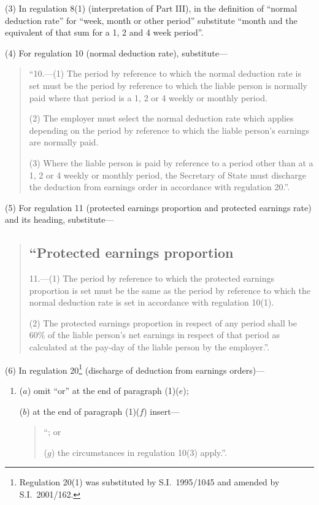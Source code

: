 \documentclass[12pt,a4paper]{article}
\begin{document}
(3) In regulation 8(1) (interpretation of Part III), in the definition of “normal deduction rate” for “week, month or other period” substitute “month and the equivalent of that sum for a 1, 2 and 4 week period”.

(4) For regulation 10 (normal deduction rate), substitute—
\begin{quotation}
“10.---(1)  The period by reference to which the normal deduction rate is set must be the period by reference to which the liable person is normally paid where that period is a 1, 2 or 4 weekly or monthly period.

(2) The employer must select the normal deduction rate which applies depending on the period by reference to which the liable person’s earnings are normally paid.

(3) Where the liable person is paid by reference to a period other than at a 1, 2 or 4 weekly or monthly period, the Secretary of State must discharge the deduction from earnings order in accordance with regulation 20.”.
\end{quotation}

(5) For regulation 11 (protected earnings proportion and protected earnings rate) and its heading, substitute—
\begin{quotation}
\subsection*{“Protected earnings proportion}

11.---(1)  The period by reference to which the protected earnings proportion is set must be the same as the period by reference to which the normal deduction rate is set in accordance with regulation 10(1).

(2) The protected earnings proportion in respect of any period shall be 60\% of the liable person’s net earnings in respect of that period as calculated at the pay-day of the liable person by the employer.”.
\end{quotation}

(6) In regulation 20\footnote{Regulation 20(1) was substituted by S.I.~1995/1045 and amended by S.I.~2001/162.} (discharge of deduction from earnings orders)—
\begin{enumerate}\item[]
($a$) omit “or” at the end of paragraph (1)($e$);

($b$) at the end of paragraph (1)($f$)  insert—
\begin{quotation}
“; or

($g$) the circumstances in regulation 10(3) apply.”.
\end{quotation}
\end{enumerate}
\end{document}
